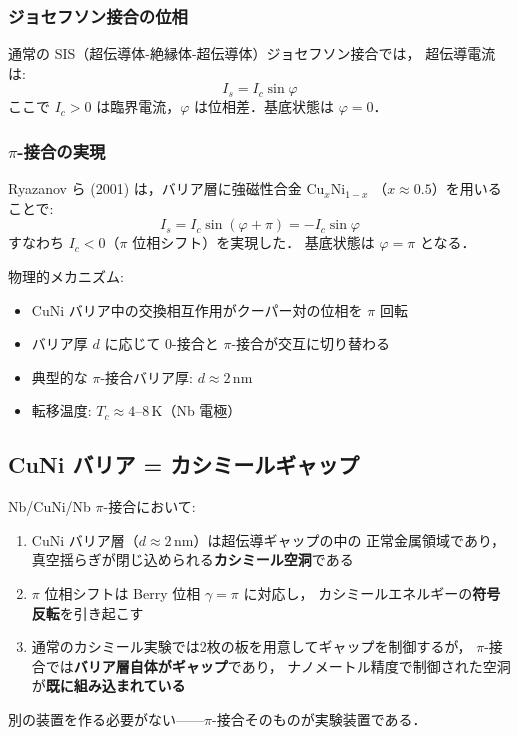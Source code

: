\documentclass[11pt,a4paper]{article}
\begin{document}
\subsubsection{ジョセフソン接合の位相}

通常の SIS（超伝導体-絶縁体-超伝導体）ジョセフソン接合では，
超伝導電流は:
\begin{equation}
I_s = I_c \sin\varphi
\end{equation}
ここで $I_c > 0$ は臨界電流，$\varphi$ は位相差．基底状態は $\varphi = 0$．

\subsubsection{$\pi$-接合の実現}

Ryazanov ら (2001) は，バリア層に強磁性合金 Cu$_x$Ni$_{1-x}$
（$x \approx 0.5$）を用いることで:
\begin{equation}
I_s = I_c \sin(\varphi + \pi) = -I_c \sin\varphi
\end{equation}
すなわち $I_c < 0$（$\pi$ 位相シフト）を実現した．
基底状態は $\varphi = \pi$ となる．

物理的メカニズム:
\begin{itemize}
\item CuNi バリア中の交換相互作用がクーパー対の位相を $\pi$ 回転
\item バリア厚 $d$ に応じて $0$-接合と $\pi$-接合が交互に切り替わる
\item 典型的な $\pi$-接合バリア厚: $d \approx 2$\,nm
\item 転移温度: $T_c \approx 4$--$8$\,K（Nb 電極）
\end{itemize}

\subsection{CuNi バリア = カシミールギャップ}

\begin{keyresult}
Nb/CuNi/Nb $\pi$-接合において:
\begin{enumerate}
\item CuNi バリア層（$d \approx 2$\,nm）は超伝導ギャップの中の
  正常金属領域であり，真空揺らぎが閉じ込められる\textbf{カシミール空洞}である
\item $\pi$ 位相シフトは Berry 位相 $\gamma = \pi$ に対応し，
  カシミールエネルギーの\textbf{符号反転}を引き起こす
\item 通常のカシミール実験では2枚の板を用意してギャップを制御するが，
  $\pi$-接合では\textbf{バリア層自体がギャップ}であり，
  ナノメートル精度で制御された空洞が\textbf{既に組み込まれている}
\end{enumerate}
別の装置を作る必要がない——$\pi$-接合そのものが実験装置である．
\end{keyresult}
\end{document}
